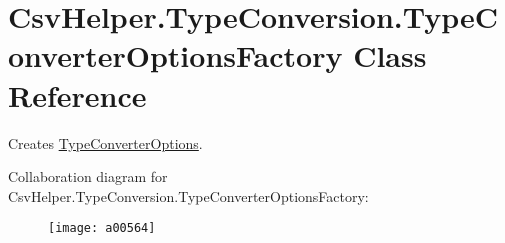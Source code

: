 \hypertarget{a00173}{\section{Csv\-Helper.\-Type\-Conversion.\-Type\-Converter\-Options\-Factory Class Reference}
\label{a00173}
}


Creates \hyperlink{a00172}{Type\-Converter\-Options}.  




Collaboration diagram for Csv\-Helper.\-Type\-Conversion.\-Type\-Converter\-Options\-Factory\-:
\nopagebreak
\begin{figure}[H]
\begin{center}
\leavevmode
\texttt{[image: a00564]}
\end{center}
\end{figure}
